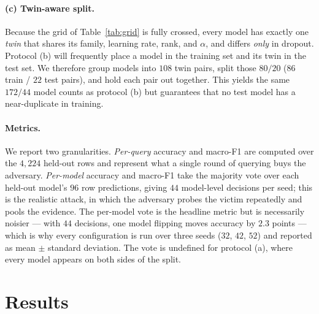 \documentclass[11pt]{article}
\begin{document}
\paragraph{(c) Twin-aware split.} Because the grid of Table~\ref{tab:grid} is fully
crossed, every model has exactly one \emph{twin} that shares its family, learning rate,
rank, and $\alpha$, and differs \emph{only} in dropout. Protocol (b) will frequently place
a model in the training set and its twin in the test set. We therefore group models into
$108$ twin pairs, split those $80/20$ ($86$ train / $22$ test pairs), and hold each pair
out together. This yields the same $172/44$ model counts as protocol (b) but guarantees
that no test model has a near-duplicate in training.

\paragraph{Metrics.} We report two granularities. \emph{Per-query} accuracy and macro-F1
are computed over the $4{,}224$ held-out rows and represent what a single round of
querying buys the adversary. \emph{Per-model} accuracy and macro-F1 take the majority vote
over each held-out model's $96$ row predictions, giving $44$ model-level decisions per
seed; this is the realistic attack, in which the adversary probes the victim repeatedly
and pools the evidence. The per-model vote is the headline metric but is necessarily
noisier --- with $44$ decisions, one model flipping moves accuracy by $2.3$ points ---
which is why every configuration is run over three seeds ($32$, $42$, $52$) and reported
as mean $\pm$ standard deviation. The vote is undefined for protocol (a), where every
model appears on both sides of the split.

\section{Results}
\label{sec:trans-results}
\end{document}
